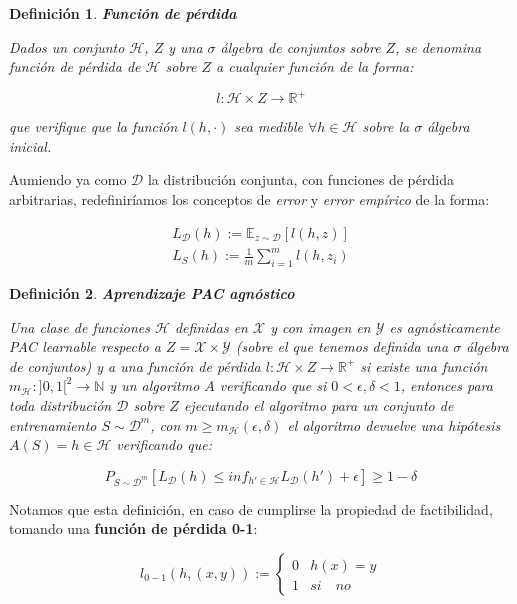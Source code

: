 \documentclass[11pt]{article}
\newtheorem{definition}{Definición}
\begin{document}
\begin{definition}
\textbf{Función de pérdida}

Dados un conjunto $\mathcal{H}$, $Z$ y una $\sigma$ álgebra de conjuntos sobre $Z$, se denomina función de pérdida de $\mathcal{H}$ sobre $Z$ a cualquier función de la forma:

\[l : \mathcal{H} \times Z \rightarrow \mathbb{R}^{+}\]

que verifique que la función $l(h, \cdot)$ sea medible $\forall h\in \mathcal{H}$ sobre la $\sigma$ álgebra inicial.
\end{definition}

Aumiendo ya como $\mathcal{D}$ la distribución conjunta, con funciones de pérdida arbitrarias, redefiniríamos los conceptos de \emph{error} y \emph{error empírico} de la forma:

\begin{align*}
L_{\mathcal{D}} (h) := \mathbb{E}_{z\sim \mathcal{D}}[l(h,z)]\\
L_{S} (h) := \frac{1}{m} \sum_{i=1}^m l(h,z_i)
\end{align*}

\begin{definition}
\textbf{Aprendizaje PAC agnóstico}

Una clase de funciones $\mathcal{H}$ definidas en $\mathcal{X}$ y con imagen en $\mathcal{Y}$ es agnósticamente PAC learnable respecto a $Z = \mathcal{X} \times \mathcal{Y}$ (sobre el que tenemos definida una $\sigma$ álgebra de conjuntos) y a una función de pérdida $l: \mathcal{H} \times Z \rightarrow \mathbb{R}^{+}$ si existe una función $m_{\mathcal{H}} : ]0,1[^2\rightarrow \mathbb{N}$ y un algoritmo $A$ verificando que si $0 < \epsilon, \delta < 1$, entonces para toda distribución $\mathcal{D}$ sobre $Z$ ejecutando el algoritmo para un conjunto de entrenamiento $S\sim \mathcal{D}^m$, con $m\ge m_{\mathcal{H}}(\epsilon, \delta)$ el algoritmo devuelve una hipótesis $A(S) = h\in \mathcal{H}$ verificando que:

\[P_{S\sim \mathcal{D}^m}[L_{\mathcal{D}}(h) \le inf_{h'\in \mathcal{H}} L_{\mathcal{D}}(h') + \epsilon] \ge 1-\delta\]
\end{definition}


Notamos que esta definición, en caso de cumplirse la propiedad de factibilidad, tomando una \textbf{función de pérdida 0-1}:

\[l_{0-1} (h,(x,y)) := \left\{\begin{array}{ll}
0 & h(x) = y\\
1 & si \quad no
\end{array}\right.\]
\end{document}
